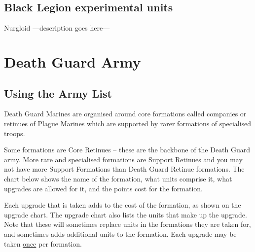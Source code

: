 \documentclass[a4paper, twocolumn]{article}
\begin{document}

\clearpage
\subsection{Black Legion experimental units}

\unit{Nurgloid} {							%
	---description goes here---
}
\statsEND									%

\twocolumn
%
\clearpage
\section{Death Guard Army}
\subsection{Using the Army List}
Death Guard Marines are organised around core formations
called companies or retinues of Plague Marines which are
supported by rarer formations of specialised troops.

Some formations are Core Retinues – these are the backbone
of the Death Guard army. More rare and specialised
formations are Support Retinues and you may not have more
Support Formations than Death Guard Retinue formations.
The chart below shows the name of the formation, what units
comprise it, what upgrades are allowed for it, and the points
cost for the formation.

Each upgrade that is taken adds to the cost of the formation,
as shown on the upgrade chart. The upgrade chart also lists
the units that make up the upgrade. Note that these will
sometimes replace units in the formations they are taken for,
and sometimes adds additional units to the formation. Each
upgrade may be taken \underline{once} per formation.
\end{document}
